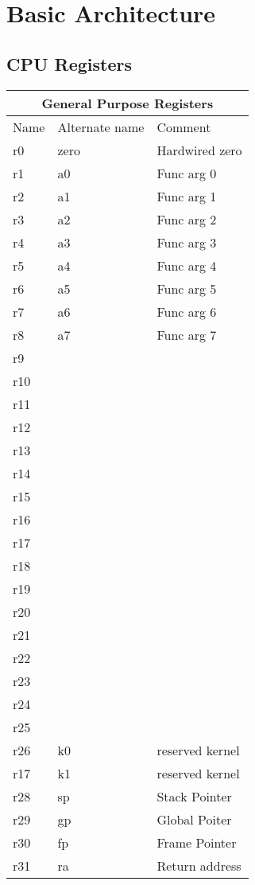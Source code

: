 \chapter{Basic Architecture}

\section{CPU Registers}

\begin{tabular}{ |p{3cm}|p{3cm}|p{3cm}|  }
    \hline
    \multicolumn{3}{|c|}{General Purpose Registers} \\
    \hline
    Name& Alternate name & Comment \\
    \hline
    r0  & zero &   Hardwired zero\\
    r1  & a0   &   Func arg 0 \\
    r2  & a1   &   Func arg 1 \\
    r3  & a2   &   Func arg 2 \\
    r4  & a3   &   Func arg 3 \\
    r5  & a4   &   Func arg 4 \\
    r6  & a5   &   Func arg 5 \\
    r7  & a6   &   Func arg 6 \\
    r8  & a7   &   Func arg 7 \\
    r9  &      &  \\
    r10 &      &  \\
    r11 &      &  \\
    r12 &      &  \\
    r13 &      &  \\
    r14 &      &  \\
    r15 &      &  \\
    r16 &      &  \\
    r17 &      &  \\
    r18 &      &  \\
    r19 &      &  \\
    r20 &      &  \\
    r21 &      &  \\
    r22 &      &  \\
    r23 &      &  \\
    r24 &      &  \\
    r25 &      &  \\
    r26 & k0   &  reserved kernel \\
    r17 & k1   &  reserved kernel \\
    r28 & sp   &  Stack Pointer \\
    r29 & gp   &  Global Poiter \\
    r30 & fp   &  Frame Pointer \\
    r31 & ra   &  Return address \\

    \hline
   \end{tabular}
